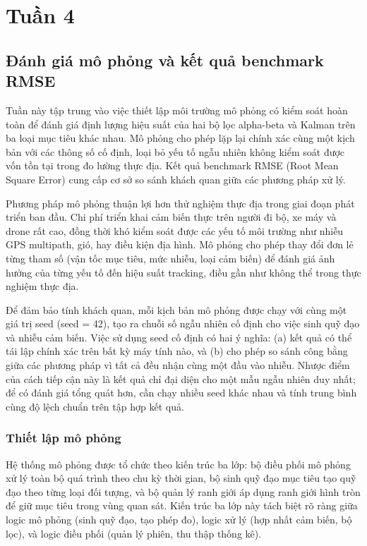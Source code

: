 \section{Tuần 4}

\subsection{Đánh giá mô phỏng và kết quả benchmark RMSE}

\hspace{0.5cm} Tuần này tập trung vào việc thiết lập môi trường mô phỏng có kiểm soát hoàn toàn để đánh giá định lượng hiệu suất của hai bộ lọc alpha-beta và Kalman trên ba loại mục tiêu khác nhau. Mô phỏng cho phép lặp lại chính xác cùng một kịch bản với các thông số cố định, loại bỏ yếu tố ngẫu nhiên không kiểm soát được vốn tồn tại trong đo lường thực địa. Kết quả benchmark RMSE (Root Mean Square Error) cung cấp cơ sở so sánh khách quan giữa các phương pháp xử lý.

Phương pháp mô phỏng thuận lợi hơn thử nghiệm thực địa trong giai đoạn phát triển ban đầu. Chi phí triển khai cảm biến thực trên người đi bộ, xe máy và drone rất cao, đồng thời khó kiểm soát được các yếu tố môi trường như nhiễu GPS multipath, gió, hay điều kiện địa hình. Mô phỏng cho phép thay đổi đơn lẻ từng tham số (vận tốc mục tiêu, mức nhiễu, loại cảm biến) để đánh giá ảnh hưởng của từng yếu tố đến hiệu suất tracking, điều gần như không thể trong thực nghiệm thực địa.

Để đảm bảo tính khách quan, mỗi kịch bản mô phỏng được chạy với cùng một giá trị seed (seed = 42), tạo ra chuỗi số ngẫu nhiên cố định cho việc sinh quỹ đạo và nhiễu cảm biến. Việc sử dụng seed cố định có hai ý nghĩa: (a) kết quả có thể tái lập chính xác trên bất kỳ máy tính nào, và (b) cho phép so sánh công bằng giữa các phương pháp vì tất cả đều nhận cùng một đầu vào nhiễu. Nhược điểm của cách tiếp cận này là kết quả chỉ đại diện cho một mẫu ngẫu nhiên duy nhất; để có đánh giá tổng quát hơn, cần chạy nhiều seed khác nhau và tính trung bình cùng độ lệch chuẩn trên tập hợp kết quả.

\subsubsection{Thiết lập mô phỏng}

\hspace{0.5cm} Hệ thống mô phỏng được tổ chức theo kiến trúc ba lớp: bộ điều phối mô phỏng xử lý toàn bộ quá trình theo chu kỳ thời gian, bộ sinh quỹ đạo mục tiêu tạo quỹ đạo theo từng loại đối tượng, và bộ quản lý ranh giới áp dụng ranh giới hình tròn để giữ mục tiêu trong vùng quan sát. Kiến trúc ba lớp này tách biệt rõ ràng giữa logic mô phỏng (sinh quỹ đạo, tạo phép đo), logic xử lý (hợp nhất cảm biến, bộ lọc), và logic điều phối (quản lý phiên, thu thập thống kê).

